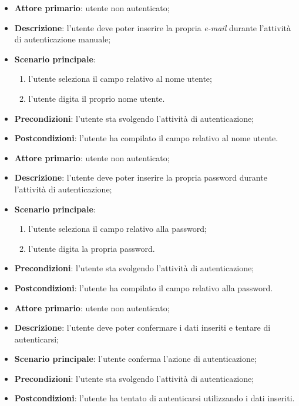 \label{uc:login_email}
\begin{itemize}
    \item \textbf{Attore primario}: utente non autenticato;
    \item \textbf{Descrizione}: l'utente deve poter inserire la propria \textit{e-mail} durante l'attività di autenticazione manuale;
    \item \textbf{Scenario principale}:
    \begin{enumerate}
        \item l'utente seleziona il campo relativo al nome utente;
        \item l'utente digita il proprio nome utente.
    \end{enumerate}
    \item \textbf{Precondizioni}: l'utente sta svolgendo l'attività di autenticazione;
    \item \textbf{Postcondizioni}: l'utente ha compilato il campo relativo al nome utente.
\end{itemize}

\label{uc:login_password}
\begin{itemize}
    \item \textbf{Attore primario}: utente non autenticato;
    \item \textbf{Descrizione}: l'utente deve poter inserire la propria password durante l'attività di autenticazione;
    \item \textbf{Scenario principale}:
    \begin{enumerate}
        \item l'utente seleziona il campo relativo alla password;
        \item l'utente digita la propria password.
    \end{enumerate}
    \item \textbf{Precondizioni}: l'utente sta svolgendo l'attività di autenticazione;
    \item \textbf{Postcondizioni}: l'utente ha compilato il campo relativo alla password.
\end{itemize}

\label{uc:login_conferma}
\begin{itemize}
    \item \textbf{Attore primario}: utente non autenticato;
    \item \textbf{Descrizione}: l'utente deve poter confermare i dati inseriti e tentare di autenticarsi;
    \item \textbf{Scenario principale}: l'utente conferma l'azione di autenticazione;
    \item \textbf{Precondizioni}: l'utente sta svolgendo l'attività di autenticazione;
    \item \textbf{Postcondizioni}: l'utente ha tentato di autenticarsi utilizzando i dati inseriti.
\end{itemize}

